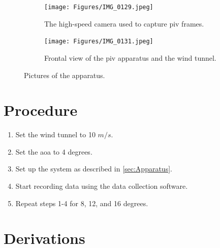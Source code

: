 \begin{figure}[htpb]
    \begin{subfigure}{0.49\textwidth}
        \centering
        \texttt{[image: Figures/IMG\_0129.jpeg]}
        \caption{The high-speed camera used to capture \acrshort{piv} frames.}
        \label{fig:high-speed_camera}
    \end{subfigure}
    \begin{subfigure}{0.49\textwidth}
        \centering
        \texttt{[image: Figures/IMG\_0131.jpeg]}
        \caption{Frontal view of the \acrshort{piv} apparatus and the wind tunnel.}
        \label{fig:full_apparatus}
    \end{subfigure}
    \caption{Pictures of the apparatus.}
    \label{fig:apparatus}
\end{figure}

\section{Procedure} \label{sec:Prodedure}

\begin{enumerate}
\item Set the wind tunnel to 10 $m/s$.
\item Set the \acrshort{aoa} to 4 degrees.
\item Set up the system as described in \autoref{sec:Apparatus}.
\item Start recording data using the data collection software.
\item Repeat steps 1-4 for 8, 12, and 16 degrees.
\end{enumerate}

\newpage

\section{Derivations} \label{sec: Derivations}

